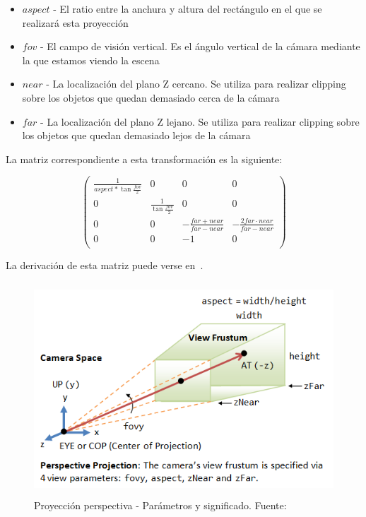 \begin{itemize}
		\item $aspect$ - El ratio entre la anchura y altura del rectángulo en el que se
				realizará esta proyección
		\item $fov$ - El campo de visión vertical. Es el ángulo vertical de la cámara
				mediante la que estamos viendo la escena
		\item $near$ - La localización del plano Z cercano. Se utiliza para realizar
				clipping sobre los objetos que quedan demasiado cerca de la
				cámara
		\item $far$ - La localización del plano Z lejano. Se utiliza para realizar
				clipping sobre los objetos que quedan demasiado lejos de la
				cámara
\end{itemize}

La matriz correspondiente a esta transformación es la siguiente:

\begin{equation}
	\left( 
		\begin{array}{cccc}
				\frac{1}{aspect*\tan{\frac{fov}{2}}} & 0 & 0 & 0 \\
				0 & \frac{1}{\tan{\frac{fov}{2}}} & 0 & 0 \\
				0 & 0 & -\frac{far+near}{far-near} & - \frac{2far \cdot near}{far
				- near} \\
				0 & 0 & -1 & 0 \\
		\end{array}	
	\right)
\end{equation}

La derivación de esta matriz puede verse en~\citet{projectionmatrix}.

\begin{figure}[ht]
	\centering	
	\includegraphics[height=8cm]{figures/projectionimage.png}
	\caption[Proyección perspectiva - Parámetros y significado.]{Proyección
	perspectiva - Parámetros y significado. Fuente:~\cite{projectionimage}}
	\label{fig:projectionimage}
\end{figure}


